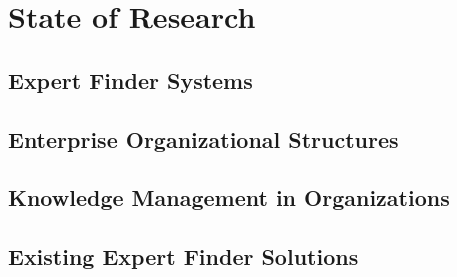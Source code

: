 \newpage
\section{State of Research} 

\subsection{Expert Finder Systems}

\subsection{Enterprise Organizational Structures}

\subsection{Knowledge Management in Organizations}

\subsection{Existing Expert Finder Solutions}